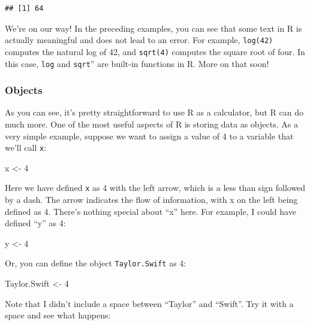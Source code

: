 \documentclass[
]{book}
\newenvironment{Shaded}{\begin{snugshade}}{\end{snugshade}}
\newcommand{\DecValTok}[1]{\textcolor[rgb]{0.00,0.00,0.81}{#1}}
\newcommand{\NormalTok}[1]{#1}
\newcommand{\OtherTok}[1]{\textcolor[rgb]{0.56,0.35,0.01}{#1}}
\begin{document}
\begin{verbatim}
## [1] 64
\end{verbatim}

We're on our way! In the preceding examples, you can see that some text in R is actually meaningful and does not lead to an error. For example, \texttt{log(42)} computes the natural log of 42, and \texttt{sqrt(4)} computes the square root of four. In this case, \texttt{log} and \texttt{sqrt}'' are built-in functions in R. More on that soon!

\subsubsection{Objects}\label{objects}

As you can see, it's pretty straightforward to use R as a calculator, but R can do much more. One of the most useful aspects of R is storing data as objects. As a very simple example, suppose we want to assign a value of 4 to a variable that we'll call \texttt{x}:

\begin{Shaded}
\begin{Highlighting}[]
\NormalTok{x }\OtherTok{\textless{}{-}} \DecValTok{4}
\end{Highlighting}
\end{Shaded}

Here we have defined \texttt{x} as 4 with the left arrow, which is a less than sign followed by a dash. The arrow indicates the flow of information, with x on the left being defined as 4. There's nothing special about ``x'' here. For example, I could have defined ``y'' as 4:

\begin{Shaded}
\begin{Highlighting}[]
\NormalTok{y }\OtherTok{\textless{}{-}} \DecValTok{4}
\end{Highlighting}
\end{Shaded}

Or, you can define the object \texttt{Taylor.Swift} as 4:

\begin{Shaded}
\begin{Highlighting}[]
\NormalTok{Taylor.Swift }\OtherTok{\textless{}{-}} \DecValTok{4}
\end{Highlighting}
\end{Shaded}

Note that I didn't include a space between ``Taylor'' and ``Swift''. Try it with a space and see what happens:
\end{document}
